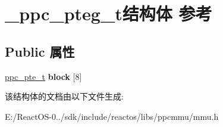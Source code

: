 \hypertarget{struct__ppc__pteg__t}{}\section{\+\_\+ppc\+\_\+pteg\+\_\+t结构体 参考}
\label{struct__ppc__pteg__t}
\subsection*{Public 属性}
\begin{DoxyCompactItemize}
\item 
\mbox{\label{struct__ppc__pteg__t_aa68c915ab8ec7ba593f3dc290826b3e1}} 
\hyperlink{struct__ppc__pte__t}{ppc\+\_\+pte\+\_\+t} {\bfseries block} \mbox{[}8\mbox{]}
\end{DoxyCompactItemize}


该结构体的文档由以下文件生成\+:\begin{DoxyCompactItemize}
\item 
E\+:/\+React\+O\+S-\/0../sdk/include/reactos/libs/ppcmmu/mmu.\+h\end{DoxyCompactItemize}
